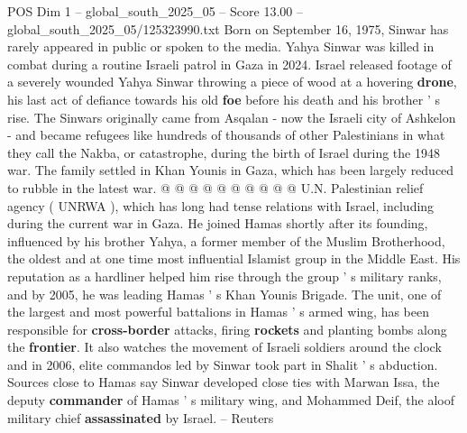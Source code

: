 \begin{textsample}{POS Dim 1 – global\_south\_2025\_05 – Score 13.00 – global\_south\_2025\_05/125323990.txt}
Born on September 16, 1975, Sinwar has rarely appeared in public or spoken to the media.
Yahya Sinwar was killed in combat during a routine Israeli patrol in Gaza in 2024.
Israel released footage of a severely wounded Yahya Sinwar throwing a piece of wood at a hovering \textbf{drone}, his last act of defiance towards his old \textbf{foe} before his death and his brother ' s rise.
The Sinwars originally came from Asqalan - now the Israeli city of Ashkelon - and became refugees like hundreds of thousands of other Palestinians in what they call the Nakba, or catastrophe, during the birth of Israel during the 1948 war.
The family settled in Khan Younis in Gaza, which has been largely reduced to rubble in the latest war. @ @ @ @ @ @ @ @ @ @ U.N.
Palestinian relief agency ( UNRWA ), which has long had tense relations with Israel, including during the current war in Gaza.
He joined Hamas shortly after its founding, influenced by his brother Yahya, a former member of the Muslim Brotherhood, the oldest and at one time most influential Islamist group in the Middle East.
His reputation as a hardliner helped him rise through the group ' s military ranks, and by 2005, he was leading Hamas ' s Khan Younis Brigade.
The unit, one of the largest and most powerful battalions in Hamas ' s armed wing, has been responsible for \textbf{cross-border} attacks, firing \textbf{rockets} and planting bombs along the \textbf{frontier}.
It also watches the movement of Israeli soldiers around the clock and in 2006, elite commandos led by Sinwar took part in Shalit ' s abduction.
Sources close to Hamas say Sinwar developed close ties with Marwan Issa, the deputy \textbf{commander} of Hamas ' s military wing, and Mohammed Deif, the aloof military chief \textbf{assassinated} by Israel. -- Reuters

\end{textsample}

